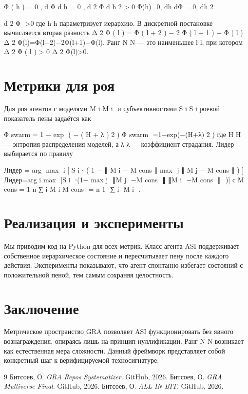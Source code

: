 \documentclass{article}
\begin{document}
Φ
(
h
)
=
0
,
d
Φ
d
h
=
0
,
d
2
Φ
d
h
2
>
0
Φ(h)=0, 
dh
dΦ
​
 =0, 
dh 
2
 
d 
2
 Φ
​
 >0
где 
h
h параметризует иерархию. В дискретной постановке вычисляется вторая разность 
Δ
2
Φ
(
l
)
=
Φ
(
l
+
2
)
−
2
Φ
(
l
+
1
)
+
Φ
(
l
)
Δ 
2
 Φ(l)=Φ(l+2)−2Φ(l+1)+Φ(l). Ранг 
N
N — это наименьшее 
l
l, при котором 
Δ
2
Φ
(
l
)
>
0
Δ 
2
 Φ(l)>0.

\section{Метрики для роя}
Для роя агентов с моделями 
M
i
M 
i
​
  и субъективностями 
S
i
S 
i
​
  роевой показатель пены задаётся как

Φ
swarm
=
1
−
exp
⁡
(
−
(
H
+
λ
)
2
)
Φ 
swarm
​
 =1−exp(−(H+λ) 
2
 )
где 
H
H — энтропия распределения моделей, а 
λ
λ — коэффициент страдания. Лидер выбирается по правилу

Лидер
=
arg
⁡
max
⁡
i
[
S
i
⋅
(
1
−
∥
M
i
−
M
cons
∥
max
⁡
j
∥
M
j
−
M
cons
∥
)
]
Лидер=arg 
i
max
​
 [S 
i
​
 ⋅(1− 
max 
j
​
 ∥M 
j
​
 −M 
cons
​
 ∥
∥M 
i
​
 −M 
cons
​
 ∥
​
 )]
с 
M
cons
=
1
n
∑
i
M
i
M 
cons
​
 = 
n
1
​
 ∑ 
i
​
 M 
i
​
 .

\section{Реализация и эксперименты}
Мы приводим код на Python для всех метрик. Класс агента ASI поддерживает собственное иерархическое состояние и пересчитывает пену после каждого действия. Эксперименты показывают, что агент спонтанно избегает состояний с положительной пеной, тем самым сохраняя целостность.

\section{Заключение}
Метрическое пространство GRA позволяет ASI функционировать без явного вознаграждения, опираясь лишь на принцип нуллификации. Ранг 
N
N возникает как естественная мера сложности. Данный фреймворк представляет собой конкретный шаг к верифицируемой техносигнатуре.

\begin{thebibliography}{9}
 Битсоев, О. \textit{GRA Repos Systematizer}. GitHub, 2026.
 Битсоев, О. \textit{GRA Multiverse Final}. GitHub, 2026.
 Битсоев, О. \textit{ALL IN BIT}. GitHub, 2026.
\end{thebibliography}
\end{document}
